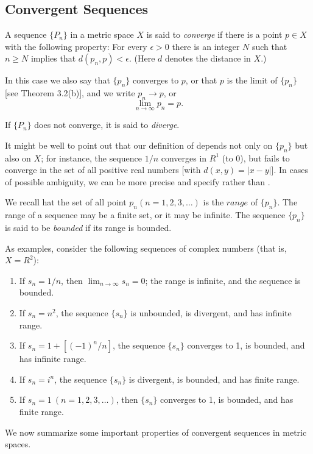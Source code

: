 \documentclass[../poma-notes.tex]{subfiles}
\begin{document}
\subsection*{Convergent Sequences}

\begin{definition}
  A sequence $\{P_n\}$ in a metric space $X$ is said to \textit{converge} if there is a point $p \in X$ with the
  following property: For every $\epsilon > 0$ there is an integer $N$ such that $n \ge N$ implies that
  $d(p_n,p) < \epsilon$. (Here $d$ denotes the distance in $X$.)

  In this case we also say that $\{p_n\}$ converges to $p$, or that $p$ is the limit of $\{p_n\}$
  [see Theorem 3.2(b)], and we write $p_n \to p$, or
  \[\lim_{n \to \infty} p_n = p.\]

  If $\{P_n\}$ does not converge, it is said to \textit{diverge}.

  It might be well to point out that our definition of  depends not only on $\{p_n\}$
  but also on $X$; for instance, the sequence ${1/n}$ converges in $R^1$ (to $0$), but fails to converge in the set
  of all positive real numbers [with $d(x,y)=|x-y|$]. In cases of possible ambiguity, we can be more precise and
  specify  rather than .

  We recall hat the set of all point $p_n (n=1,2,3,\dots)$ is the $\textit{range}$ of $\{p_n\}$. The range of a
  sequence may be a finite set, or it may be infinite. The sequence $\{p_n\}$ is said to be \textit{bounded} if
  its range is bounded.

  As examples, consider the following sequences of complex numbers (that is, $X = R^2$):
  \begin{enumerate}[label=(\alph*)]
    \item If $s_n = 1/n$, then $\lim_{n \to \infty} s_n = 0$; the range is infinite, and the sequence is bounded.
    \item If $s_n = n^2$, the sequence $\{s_n\}$ is unbounded, is divergent, and has infinite range.
    \item If $s_n = 1 + [(-1)^n/n]$, the sequence $\{s_n\}$ converges to 1, is bounded, and has infinite range.
    \item If $s_n = i^n$, the sequence $\{s_n\}$ is divergent, is bounded, and has finite range.
    \item If $s_n = 1\ (n=1,2,3,\dots)$, then $\{s_n\}$ converges to 1, is bounded, and has finite range.
  \end{enumerate}

  We now summarize some important properties of convergent sequences in metric spaces.
\end{definition}
\end{document}
